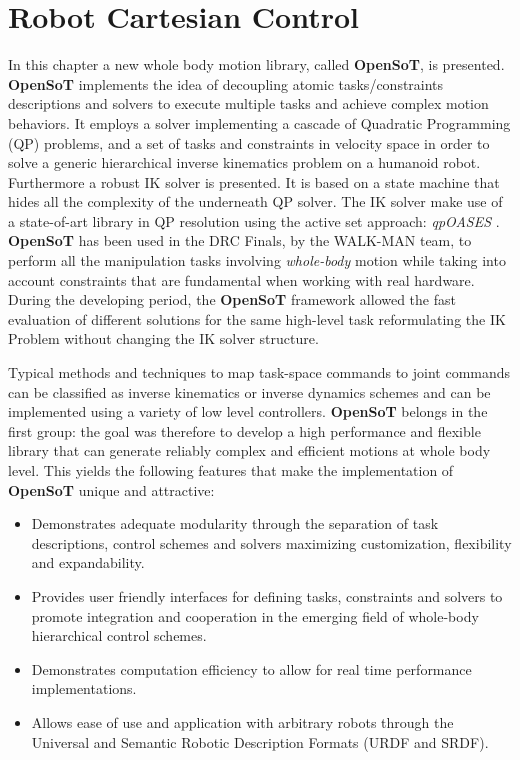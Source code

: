 %
\chapter{Robot Cartesian Control}
\label{sec:concepts}

\let\thefootnote\relax{}

In this chapter a new whole body motion library, called \textbf{OpenSoT}, is presented. \textbf{OpenSoT} implements the idea of decoupling atomic tasks/constraints descriptions and solvers to execute multiple tasks and achieve complex motion behaviors. It employs a solver implementing a cascade of Quadratic Programming (QP) problems, and a set of tasks and constraints in velocity space in order to solve a generic hierarchical inverse kinematics problem on a humanoid robot. Furthermore a robust IK solver is presented. It is based on a state machine that hides all the complexity of the underneath QP solver. The IK solver make use of a state-of-art library in QP resolution using the active set approach: \emph{qpOASES} \cite{Ferreau:14}. 
\textbf{OpenSoT} has been used in the DRC Finals, by the WALK-MAN team, to perform all the manipulation tasks involving \emph{whole-body} motion while taking into account constraints that are fundamental when working with real hardware. During the developing period, the \textbf{OpenSoT} framework allowed the fast evaluation of different solutions for the same high-level task reformulating the IK Problem without changing the IK solver structure. 

Typical methods and techniques to map task-space commands to joint commands can be classified as inverse kinematics or inverse dynamics schemes and can be implemented using a variety of low level controllers. \textbf{OpenSoT} belongs in the first group: the goal was therefore to develop a high performance and flexible library that can generate reliably complex and efficient motions at whole body level. This yields the following features that make the implementation of \textbf{OpenSoT} unique and attractive:   
\begin{itemize}
\item Demonstrates adequate modularity through the separation of task descriptions, control schemes and solvers maximizing customization, flexibility and expandability.  
\item Provides user friendly interfaces for defining tasks, constraints and solvers to promote integration and cooperation in the emerging field of whole-body hierarchical control schemes.
\item Demonstrates computation efficiency to allow for real time performance implementations.
\item Allows ease of use and application with arbitrary robots through the Universal and Semantic Robotic Description Formats (URDF and SRDF).
\end{itemize}

